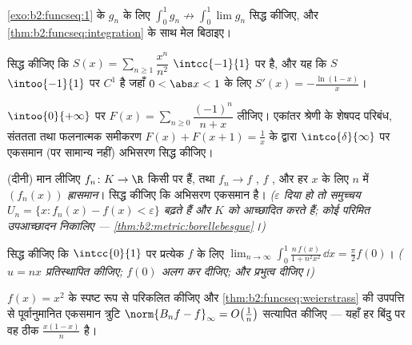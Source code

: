 \begin{exercise}[$\star$]\label{exo:b2:funcseq:2}
\cref{exo:b2:funcseq:1} के $g_n$ के लिए $\displaystyle\int_0^1 g_n \not\to \int_0^1 \lim g_n$ सिद्ध कीजिए, और \cref{thm:b2:funcseq:integration} के साथ मेल बिठाइए।
\end{exercise}

\begin{exercise}[$\star$]\label{exo:b2:funcseq:3}
सिद्ध कीजिए कि $S(x) = \sum_{n\geq1} \dfrac{x^n}{n^2}$ $\intcc{-1}{1}$ पर  है, और यह कि $S$ $\intoo{-1}{1}$ पर $C^1$ है जहाँ $0 < \abs x < 1$
के लिए $S'(x) = -\frac{\ln(1-x)}{x}$।
\end{exercise}

\begin{exercise}[$\star\star$]\label{exo:b2:funcseq:4}
$\intoo{0}{+\infty}$ पर $F(x) = \sum_{n \geq 0} \dfrac{(-1)^n}{n + x}$ लीजिए। एकांतर श्रेणी के शेषपद परिबंध, संततता तथा फलनात्मक
समीकरण $F(x) + F(x + 1) =
\frac1x$ के द्वारा $\intco{\delta}{\infty}$ पर एकसमान (पर सामान्य नहीं) अभिसरण सिद्ध कीजिए।
\end{exercise}

\begin{exercise}[$\star\star$]\label{exo:b2:funcseq:5}
(दीनी) मान लीजिए $f_n \colon K \to \R$ किसी \emph{}  पर  हैं, तथा $f_n \to f$
\emph{}, $f$ , और हर $x$ के लिए $n$ में $(f_n(x))$ \emph{ह्रासमान}।
सिद्ध कीजिए कि अभिसरण एकसमान है। \emph{($\varepsilon$ दिया हो तो  समुच्चय $U_n = \{x : f_n(x) - f(x) < \varepsilon\}$
बढ़ते हैं और $K$ को आच्छादित करते हैं; कोई परिमित उपआच्छादन निकालिए ---
\cref{thm:b2:metric:borellebesgue}।)}
\end{exercise}

\begin{exercise}[$\star\star$]\label{exo:b2:funcseq:6}
सिद्ध कीजिए कि $\intcc{0}{1}$ पर प्रत्येक  $f$ के लिए $\displaystyle\lim_{n\to\infty} \int_0^1
\frac{n\,f(x)}{1 + n^2x^2}\,\dd x = \frac{\pi}{2} f(0)$। \emph{($u = nx$
प्रतिस्थापित कीजिए; $f(0)$ अलग कर दीजिए; और प्रभुत्व दीजिए।)}
\end{exercise}

\begin{exercise}[$\star\star$]\label{exo:b2:funcseq:7}
$f(x) = x^2$ के  स्पष्ट रूप से परिकलित कीजिए और \cref{thm:b2:funcseq:weierstrass} की उपपत्ति से
पूर्वानुमानित एकसमान त्रुटि $\norm{B_n f - f}_\infty =
O\bigl(\frac1n\bigr)$ सत्यापित कीजिए --- यहाँ हर बिंदु पर वह
ठीक $\frac{x(1 -
x)}{n}$ है।
\end{exercise}

